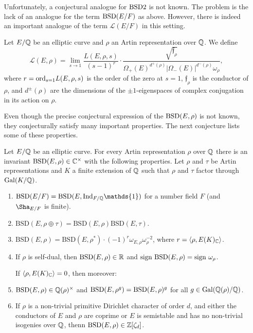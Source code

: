 Unfortunately, a conjectural analogue for $\mathrm{BSD}2$ is not known. The problem is the lack of an analogue for the term $\mathrm{BSD}(E/F)$ as above. However, there is indeed an important analogue of the term $\mathcal{L}(E/F)$ in this setting.

\begin{notation}
    Let $E/\mathbb{Q}$ be an elliptic curve and $\rho$ an Artin representation over $\mathbb{Q}$. We define
    $$\mathcal{L}(E,\rho)=\lim_{s\to1}\frac{L(E,\rho,s)}{(s-1)^r}\cdot\frac{\sqrt{\mathfrak{f}_\rho}}{\Omega_+(E)^{d^+(\rho)}|\Omega_-(E)|^{d^-(\rho)}\omega_\rho},$$
    where $r = \mathrm{ord}_{s=1} L(E, \rho, s)$ is the order of the zero at $s = 1$, $\mathfrak{f}_\rho$ is the conductor of $\rho$, and $d^{\pm}(\rho)$ are the dimensions of the $\pm1$-eigenspaces of complex conjugation in its action on $\rho$.
\end{notation}

Even though the precise conjectural expression of the $\mathrm{BSD}(E,\rho)$ is not known, they conjecturally satisfy many important properties. The next conjecture lists some of these properties.

\begin{conj}\cite[Conjecture 4]{DEW1}\label{conj_4}
    Let $E/\mathbb{Q}$ be an elliptic curve. For every Artin representation $\rho$ over $\mathbb{Q}$ there is an invariant $\mathrm{BSD}(E,\rho)\in\mathbb{C}^{\times}$ with the following properties. Let $\rho$ and $\tau$ be Artin representations and $K$ a finite extension of $\mathbb{Q}$ such that $\rho$ and $\tau$ factor through $\mathrm{Gal}(K/\mathbb{Q})$.
    \begin{enumerate}[label={\bfseries C\arabic*.}]
        \item $\mathrm{BSD}(E/F)=\mathrm{BSD}(E,\Ind_{F/\QQ}\mathds{1})$ for a number field $F$ (and $\Sha_{E/F}$ is finite).
        \item $\mathrm{BSD}(E,\rho\oplus\tau)=\mathrm{BSD}(E,\rho)\mathrm{BSD}(E,\tau)$.
        \item $\mathrm{BSD}(E,\rho)=\mathrm{BSD}(E,\rho^*)\cdot(-1)^{r}\omega_{E,\rho}\omega_\rho^{-2}$, where $r=\langle\rho,E(K)_{\mathbb{C}}\rangle$.
        \item If $\rho$ is self-dual, then $\mathrm{BSD}(E,\rho)\in\mathbb{R}$ and $\sign\ \mathrm{BSD}(E,\rho)=\sign\ \omega_\rho$.
        
        If $\langle\rho,E(K)_{\mathbb{C}}\rangle=0$, then moreover:
        \item $\mathrm{BSD}(E,\rho)\in\mathbb{Q}(\rho)^{\times}$ and $\mathrm{BSD}(E,\rho^g)=\mathrm{BSD}(E,\rho)^g$ for all $g\in\mathrm{Gal}(\mathbb{Q}(\rho)/\mathbb{Q})$.
        \item If $\rho$ is a non-trivial primitive Dirichlet character of order $d$, and either the conductors of $E$ and $\rho$ are coprime or $E$ is semistable and has no non-trivial isogenies over $\mathbb{Q}$, thenn $\mathrm{BSD}(E,\rho)\in\mathbb{Z}[\zeta_d]$. 
    \end{enumerate}
\end{conj}

